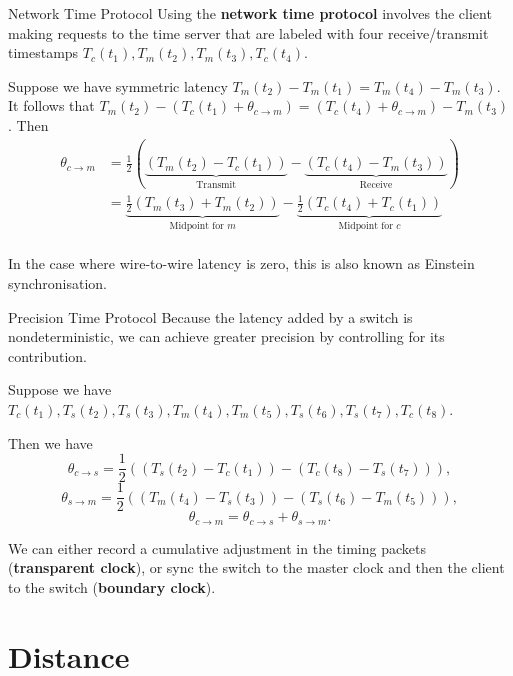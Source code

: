 \documentclass{beamer}
\newcommand{\sectionquote}[1]{%
    \def\insertsquote{\small #1}%
}
\newcommand{\insertsquote}{}
\renewcommand{\insertsquote}{}
\begin{document}
\begin{frame}{Network Time Protocol}
	Using the \textbf{network time protocol} involves the client making requests to the time server that are labeled with four receive/transmit timestamps $T_c(t_1), T_m(t_2), T_m(t_3), T_c(t_4)$.

	Suppose we have symmetric latency $T_m(t_2)-T_m(t_1) = T_m(t_4)-T_m(t_3)$.
	\pause
	It follows that $T_m(t_2)-(T_c(t_1)+\theta_{c\to m}) = (T_c(t_4)+\theta_{c\to m})-T_m(t_3)$. Then
	\begin{align*}
		\theta_{c\to m} &= \frac{1}{2}\left(\underbrace{(T_m(t_2)-T_c(t_1))}_\text{Transmit} - \underbrace{(T_c(t_4)-T_m(t_3))}_\text{Receive}\right) \\
		&= \underbrace{\frac{1}{2}(T_m(t_3)+T_m(t_2))}_{\text{Midpoint for }m} - \underbrace{\frac{1}{2}(T_c(t_4)+T_c(t_1))}_{\text{Midpoint for }c} \\
	\end{align*}

	In the case where wire-to-wire latency is zero, this is also known as Einstein synchronisation.
\end{frame}

\begin{frame}{Precision Time Protocol}
	Because the latency added by a switch is nondeterministic, we can achieve greater precision by controlling for its contribution.

	Suppose we have $T_c(t_1), T_s(t_2), T_s(t_3), T_m(t_4), T_m(t_5), T_s(t_6), T_s(t_7), T_c(t_8)$.

	\pause
	Then we have
	$$\theta_{c\to s} = \frac{1}{2}\left((T_s(t_2)-T_c(t_1)) - (T_c(t_8)-T_s(t_7))\right),$$
	$$\theta_{s\to m} = \frac{1}{2}\left((T_m(t_4)-T_s(t_3)) - (T_s(t_6)-T_m(t_5))\right),$$
	$$\theta_{c\to m} = \theta_{c\to s} + \theta_{s\to m}.$$

	\pause
	We can either record a cumulative adjustment in the timing packets (\textbf{transparent clock}), or sync the switch to the master clock and then the client to the switch (\textbf{boundary clock}).
\end{frame}

\sectionquote{``Speed is the essence of war.'' Sun Tzu \\ ``Remote fountains are of little help to nearby fires.'' Han Fei}
\section{Distance}
\end{document}
